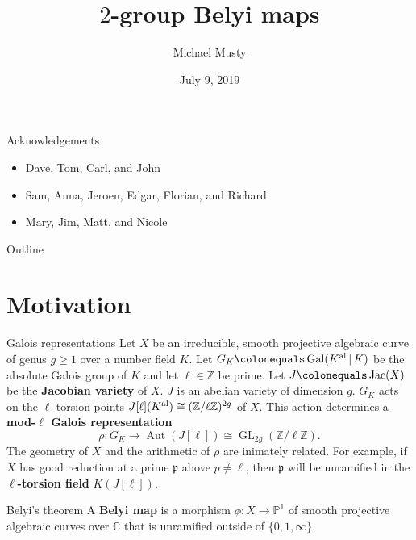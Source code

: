 \documentclass[xcolor=dvipsnames]{beamer}
\title{$2$-group Belyi maps}
\author{Michael Musty}
\date{July 9, 2019}
\institute{Dartmouth College}
\theoremstyle{plain}
\newcommand{\PP}{\mathbb P}
\newcommand{\CC}{\mathbb C}
\newcommand{\ZZ}{\mathbb Z}
\newcommand{\Kal}{{{K}^{\textup{al}}}}
\DeclareMathOperator{\Aut}{Aut}
\DeclareMathOperator{\Gal}{Gal}
\DeclareMathOperator{\GL}{GL}
\DeclareMathOperator{\Jac}{Jac}
\begin{document}
  \maketitle
  \begin{frame}{Acknowledgements}
    \begin{itemize}
      \item
        Dave, Tom, Carl, and John
      \item
        Sam, Anna, Jeroen, Edgar, Florian, and Richard
      \item
        Mary, Jim, Matt, and Nicole
    \end{itemize}
  \end{frame}
  \begin{frame}{Outline}
    \tableofcontents
  \end{frame}
  \section{Motivation}{
    \begin{frame}{Galois representations}
      Let $X$ be an irreducible, smooth
      projective algebraic curve of genus $g\geq 1$
      over a number field $K$.
      Let $G_K\colonequals\Gal(\Kal\,|\,K)$ be
      the absolute Galois group of $K$ and
      let $\ell\in\ZZ$ be prime.
      \pause\newline
      Let $J\colonequals\Jac(X)$ be the
      \textbf{Jacobian variety} of $X$.
      $J$ is an abelian variety of dimension $g$.
      \pause\newline
      $G_K$ acts on the $\ell$-torsion points
      $J[\ell](\Kal)\cong(\ZZ/\ell\ZZ)^{2g}$ of $X$.
      \pause\newline
      This action determines a
      \textbf{mod-$\ell$ Galois representation}
      \[
        \rho\colon G_K\to\Aut(J[\ell])\cong\GL_{2g}(\ZZ/\ell\ZZ).
      \]
      \pause
      The geometry of $X$ and the arithmetic of
      $\rho$ are inimately related.
      \pause
      For example,
      if $X$ has good reduction at a prime
      $\mathfrak{p}$ above
      $p\neq\ell$,
      then $\mathfrak{p}$
      will be unramified in the
      \textbf{$\ell$-torsion field}
      $K(J[\ell])$.
    \end{frame}
    \begin{frame}{Belyi's theorem}
      A \textbf{Belyi map}
      is a morphism
      $\phi\colon X\to\PP^1$
      of smooth projective algebraic curves
      over $\CC$
      that is unramified outside of
      $\{0,1,\infty\}$.
      \pause

\end{frame}}
\end{document}
